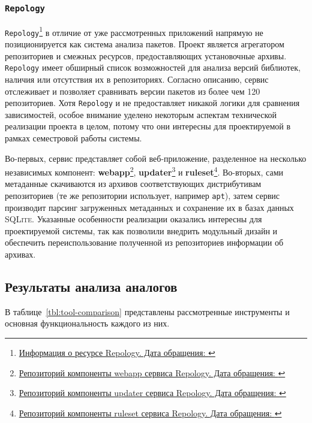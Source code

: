 \subsubsection{\texttt{Repology}}
\texttt{Repology}\footnote{\href{https://repology.org/docs/about}{Информация о ресурсе Repology. Дата обращения: }} в отличие от уже рассмотренных приложений напрямую не позиционируется как система анализа пакетов.
Проект является агрегатором репозиториев и смежных ресурсов, предоставляющих установочные архивы. \texttt{Repology} имеет обширный список возможностей для анализа версий библиотек, наличия или отсутствия их в репозиториях.
Согласно описанию, сервис отслеживает и позволяет сравнивать версии пакетов из более чем 120 репозиториев.
Хотя \texttt{Repology} и не предоставляет никакой логики для сравнения зависимостей, особое внимание уделено некоторым аспектам технической реализации проекта в целом, потому что они интересны для проектируемой в рамках семестровой работы системы.

Во-первых, сервис представляет собой веб-приложение, разделенное на несколько независимых компонент: \textbf{webapp}\footnote{\href{https://github.com/repology/repology-webapp}{Репозиторий компоненты webapp сервиса Repology. Дата обращения: }}, \textbf{updater}\footnote{\href{https://github.com/repology/repology-webapp}{Репозиторий компоненты updater сервиса Repology. Дата обращения: }} и \textbf{ruleset}\footnote{\href{https://github.com/repology/repology-webapp}{Репозиторий компоненты ruleset сервиса Repology. Дата обращения: }}.
Во-вторых, сами метаданные скачиваются из архивов соответствующих дистрибутивам репозиториев (те же репозитории использует, например \texttt{apt}), затем сервис производит парсинг загруженных метаданных и сохранение их в базах данных \textsc{SQLite}.
Указанные особенности реализации оказались интересны для проектируемой системы, так как позволили внедрить модульный дизайн и обеспечить переиспользование полученной из репозиториев информации об архивах.

\subsection{Результаты анализа аналогов}
В таблице~\ref{tbl:tool-comparison} представлены рассмотренные инструменты и основная функциональность каждого из них.

